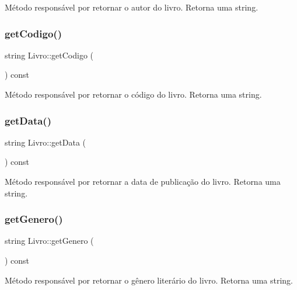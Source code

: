 Método responsável por retornar o autor do livro. Retorna uma string. \mbox{\label{classLivro_ac0bf6014dae1a0a3cb15ffac8b886f13}} 
\subsubsection{\texorpdfstring{get\+Codigo()}{getCodigo()}}
{\footnotesize\ttfamily string Livro\+::get\+Codigo (\begin{DoxyParamCaption}{ }\end{DoxyParamCaption}) const\hspace{0.3cm}{\ttfamily [inline]}}

Método responsável por retornar o código do livro. Retorna uma string. \mbox{\label{classLivro_aaf7d614049f22c09631bae2a5f83c16a}} 
\subsubsection{\texorpdfstring{get\+Data()}{getData()}}
{\footnotesize\ttfamily string Livro\+::get\+Data (\begin{DoxyParamCaption}{ }\end{DoxyParamCaption}) const\hspace{0.3cm}{\ttfamily [inline]}}

Método responsável por retornar a data de publicação do livro. Retorna uma string. \mbox{\label{classLivro_a00b6085b059571efab6d29630cf95a50}} 
\subsubsection{\texorpdfstring{get\+Genero()}{getGenero()}}
{\footnotesize\ttfamily string Livro\+::get\+Genero (\begin{DoxyParamCaption}{ }\end{DoxyParamCaption}) const\hspace{0.3cm}{\ttfamily [inline]}}

Método responsável por retornar o gênero literário do livro. Retorna uma string. \mbox{\label{classLivro_a4b4e2e74d4fa1a0e6e9a4d6c05dc3bd4}} 
